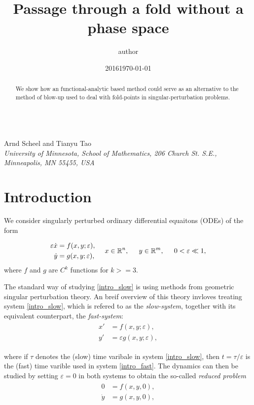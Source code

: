 \documentclass[letterpaper,11pt]{article}
\title{Passage through a fold without a phase space}
\author{author}
\date{2016}
\newcommand{\eps}{\varepsilon}
\numberwithin{equation}{section}
\theoremstyle{plain}
\begin{document}
\begin{center}

{\fontsize{17}{17}\selectfont{Alternatives to the blow-up method in singular perturbation problems}}\\[0.2in]
Arnd Scheel and Tianyu Tao\\
\textit{\footnotesize 
University of Minnesota, School of Mathematics,   206 Church St. S.E., Minneapolis, MN 55455, USA}
\date{\small \today} 
\vspace*{0.2in}
\end{center}

\begin{abstract}
\noindent 
We show how an functional-analytic based method could serve as an alternative to the method of blow-up used to deal with fold-points in singular-perturbation problems. 
\end{abstract}

\section{Introduction}
We consider singularly perturbed ordinary differential equaitons (ODEs) of the form

\begin{align}\label{intro_slow}
\begin{split}
\eps \dot{x} &=  f(x,y;\eps),\\
\dot{y } &=   g(x,y;\eps),   
\end{split}\hspace{0.2in} x\in \mathbb{R}^n, \hspace{0.2in} y \in \mathbb{R}^m, \hspace{0.2in} 0<\eps \ll 1,
\end{align}
where $f$ and $g$ are $C^k$ functions for $k>=3$.

The standard way of studying \eqref{intro_slow} is using methods from geometric singular perturbation theory. An breif overview of this theory invloves treating system \eqref{intro_slow}, which is refered to as the \textit{slow-system}, together with its  equivalent counterpart, the \textit{fast-system}:
\begin{align}\label{intro_fast}
\begin{split}
x' &=  f(x,y;\eps),\\
y' &=  \eps g(x,y;\eps),   
\end{split}
\end{align}

where if $\tau$ denotes the (slow) time varibale in system \eqref{intro_slow}, then $t = \tau/\eps$ is the (fast) time varible used in system \eqref{intro_fast}. The dynamics can then be studied by setting $\eps = 0$ in both systems to obtain the so-called \textit{reduced problem}
\begin{align}\label{intro_reduced}
\begin{split}
0 &=  f(x,y,0),\\
\dot{y} &=   g(x,y,0),   
\end{split}
\end{align}
\end{document}
